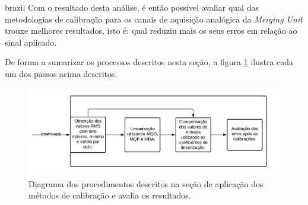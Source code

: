\begin{otherlanguage*}{brazil}
Com o resultado desta análise, é então possível avaliar qual das metodologias de calibração para os canais de aquisição analógica da \textit{Merging Unit} trouxe melhores resultados, isto é: qual reduziu mais os seus erros em relação ao sinal aplicado.

De forma a sumarizar os processos descritos nesta seção, a figura \ref{fig:diag_met_aval} ilustra cada um dos passos acima descritos.

\begin{figure}[H]
    \centering
    \includegraphics[width=14cm]{pictures/diag_met_avalia.png}
    \caption{Diagrama dos procedimentos descritos na seção de aplicação dos métodos de calibração e avalia os resultados.}
    \label{fig:diag_met_aval}
\end{figure}

\end{otherlanguage*}

